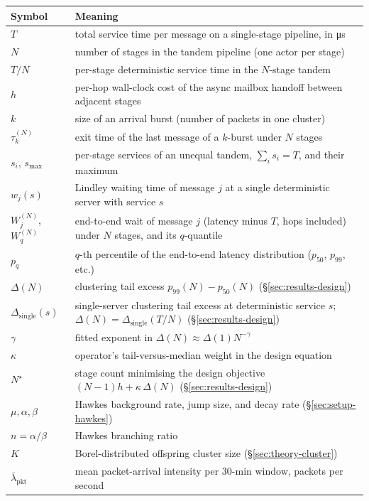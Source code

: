 \documentclass[11pt]{article}
\begin{document}
\begin{center}
\begin{tabular}{@{}lp{}@{}}
\toprule
Symbol & Meaning \\
\midrule
$T$ & total service time per message on a single-stage pipeline, in \si{\micro\second} \\
$N$ & number of stages in the tandem pipeline (one actor per stage) \\
$T/N$ & per-stage deterministic service time in the $N$-stage tandem \\
$h$ & per-hop wall-clock cost of the async mailbox handoff between adjacent stages \\
$k$ & size of an arrival burst (number of packets in one cluster) \\
$\tau_k^{(N)}$ & exit time of the last message of a $k$-burst under $N$ stages \\
$s_i$, $s_{\max}$ & per-stage services of an unequal tandem, $\sum_i s_i = T$, and their maximum \\
$w_j(s)$ & Lindley waiting time of message $j$ at a single deterministic server with service $s$ \\
$W_j^{(N)}$, $W_q^{(N)}$ & end-to-end wait of message $j$ (latency minus $T$, hops included) under $N$ stages, and its $q$-quantile \\
$p_q$ & $q$-th percentile of the end-to-end latency distribution ($p_{50}$, $p_{99}$, etc.) \\
$\Delta(N)$ & clustering tail excess $p_{99}(N) - p_{50}(N)$ (\S\ref{sec:results-design}) \\
$\Delta_{\mathrm{single}}(s)$ & single-server clustering tail excess at deterministic service $s$; $\Delta(N) = \Delta_{\mathrm{single}}(T/N)$ (\S\ref{sec:results-design}) \\
$\gamma$ & fitted exponent in $\Delta(N) \approx \Delta(1) N^{-\gamma}$ \\
$\kappa$ & operator's tail-versus-median weight in the design equation \\
$N^\star$ & stage count minimising the design objective $(N-1)h + \kappa\,\Delta(N)$ (\S\ref{sec:results-design}) \\
$\mu, \alpha, \beta$ & Hawkes background rate, jump size, and decay rate (\S\ref{sec:setup-hawkes}) \\
$n = \alpha/\beta$ & Hawkes branching ratio \\
$K$ & Borel-distributed offspring cluster size (\S\ref{sec:theory-cluster}) \\
$\bar\lambda_{\mathrm{pkt}}$ & mean packet-arrival intensity per 30-min window, packets per second \\

\end{tabular}
\end{center}
\end{document}
